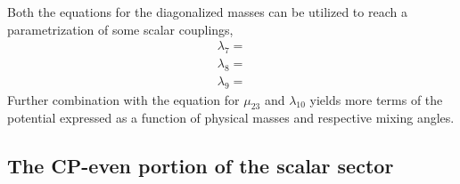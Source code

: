 Both the equations for the diagonalized masses can be utilized to reach a parametrization of some scalar couplings,
\begin{equation}
\begin{split} 
\lambda_7 = \\
\lambda_8 = \\
\lambda_9 = 
\end{split} 
\end{equation}
Further combination with the equation for $\mu_{23}$ and $\lambda_{10}$ yields more terms of the potential expressed as a function of physical masses and respective mixing angles. 

\subsection{The CP-even portion of the scalar sector}

